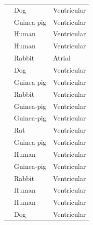 \documentclass[preprint,authoryear,12pt]{elsarticle}
\newcommand{\authornote}[2]{{\bf [#1: #2]}}
\newcommand{\gary}[1]{\authornote{Gary}{#1}}
\begin{document}
\begin{table}
\begin{center}
\begin{tabular}{l l l}
\citet{hund2004rate}	& Dog & Ventricular\\
\citet{iribe2006modulatory} & Guinea-pig & Ventricular\\
\citet{iyer2004computational}	& Human & Ventricular \\
\citet{iyer2007mechanisms}	& Human & Ventricular \\
\citet{lindblad1996model} & Rabbit & Atrial\\
\citet{livshitz2007regulation}	& Dog & Ventricular \\
\citet{luo1991model} & Guinea-pig & Ventricular\\
\citet{mahajan2008rabbit}& Rabbit & Ventricular\\
\citet{matsuoka2003role} & Guinea-pig & Ventricular\\
\citet{noble1991role}	& Guinea-pig & Ventricular\\
\citet{pandit2001mathematical} & Rat & Ventricular\\
\citet{pasek2008model} & Guinea-pig & Ventricular\\
\citet{priebe1998}	& Human & Ventricular \\
\citet{sakmann2000distribution}& Guinea-pig & Ventricular \\
\citet{shannon2004mathematical} & Rabbit & Ventricular\\
\citet{tentusscher2004}& Human & Ventricular\\
\citet{tentusscher2006}& Human & Ventricular\\
\citet{winslow1999mechanisms}	& Dog & Ventricular\\
\bottomrule
\end{tabular}
\end{center}
\end{table}
\end{document}
